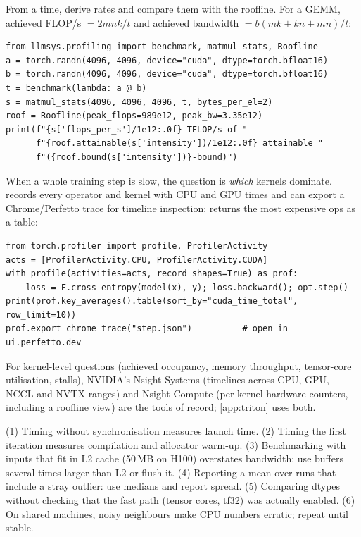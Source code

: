 From a time, derive rates and compare them with the roofline. For a GEMM, achieved FLOP/s
$= 2mnk/t$ and achieved bandwidth $= b(mk+kn+mn)/t$:

\begin{lstlisting}[caption={Placing a measured kernel on the roofline.},label={lst:pytorch:place}]
from llmsys.profiling import benchmark, matmul_stats, Roofline
a = torch.randn(4096, 4096, device="cuda", dtype=torch.bfloat16)
b = torch.randn(4096, 4096, device="cuda", dtype=torch.bfloat16)
t = benchmark(lambda: a @ b)
s = matmul_stats(4096, 4096, 4096, t, bytes_per_el=2)
roof = Roofline(peak_flops=989e12, peak_bw=3.35e12)
print(f"{s['flops_per_s']/1e12:.0f} TFLOP/s of "
      f"{roof.attainable(s['intensity'])/1e12:.0f} attainable "
      f"({roof.bound(s['intensity'])}-bound)")
\end{lstlisting}

When a whole training step is slow, the question is \emph{which} kernels dominate.  records
every operator and kernel with CPU and GPU times and can export a Chrome/Perfetto trace for timeline inspection;
 returns the most expensive ops as a table:

\begin{lstlisting}[caption={Op-level profile of one training step.},label={lst:pytorch:profiler}]
from torch.profiler import profile, ProfilerActivity
acts = [ProfilerActivity.CPU, ProfilerActivity.CUDA]
with profile(activities=acts, record_shapes=True) as prof:
    loss = F.cross_entropy(model(x), y); loss.backward(); opt.step()
print(prof.key_averages().table(sort_by="cuda_time_total", row_limit=10))
prof.export_chrome_trace("step.json")          # open in ui.perfetto.dev
\end{lstlisting}

For kernel-level questions (achieved occupancy, memory throughput, tensor-core utilisation, stalls), NVIDIA's
Nsight Systems (timelines across CPU, GPU, NCCL and NVTX ranges) and Nsight Compute (per-kernel hardware
counters, including a roofline view) are the tools of record; \cref{app:triton} uses both.

\begin{pitfall}
(1) Timing without synchronisation measures launch time. (2) Timing the first iteration measures
compilation and allocator warm-up. (3) Benchmarking with inputs that fit in L2 cache (50\,MB on H100)
overstates bandwidth; use buffers several times larger than L2 or flush it. (4) Reporting a mean over runs that
include a stray outlier: use medians and report spread. (5) Comparing dtypes without checking that the
fast path (tensor cores, tf32) was actually enabled. (6) On shared machines, noisy neighbours make CPU numbers
erratic; repeat until stable.
\end{pitfall}

